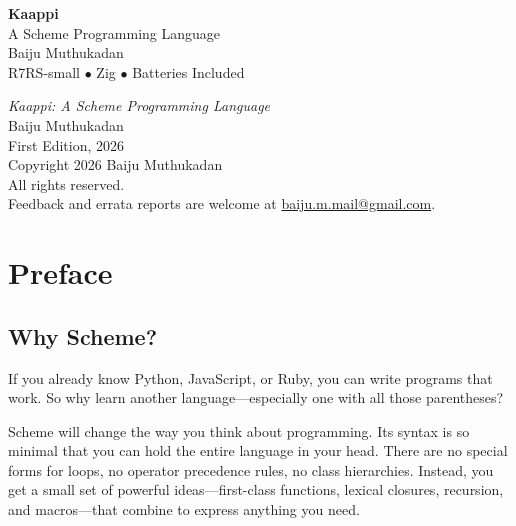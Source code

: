 \documentclass[11pt,twoside,openright]{memoir}
\begin{document}
\frontmatter
\pagestyle{empty}

\thispagestyle{empty}
\begin{center}
    \vspace*{3cm}
    {\fontsize{32}{38}\selectfont\sffamily\bfseries\color{darkbrown}
     Kaappi}\\[1cm]
    {\Large\sffamily A Scheme Programming Language}\\[3cm]
    {\large\sffamily Baiju Muthukadan}\\[1cm]
    \vfill
    {\normalsize\sffamily R7RS-small $\bullet$ Zig $\bullet$ Batteries Included}\\[1.5cm]
\end{center}
\newpage

\thispagestyle{empty}
\vspace*{\fill}
\begin{center}
    \textit{Kaappi: A Scheme Programming Language}\\[1em]
    Baiju Muthukadan\\[2em]
    First Edition, 2026\\[2em]
    Copyright \textcopyright{} 2026 Baiju Muthukadan\\
    All rights reserved.\\[2em]
    \vspace{2em}
    Feedback and errata reports are welcome at \href{mailto:baiju.m.mail@gmail.com}{baiju.m.mail@gmail.com}.
\end{center}
\vspace*{\fill}
\cleardoublepage

\pagestyle{plain}
\tableofcontents*
\cleardoublepage

\chapter{Preface}

\section*{Why Scheme?}

If you already know Python, JavaScript, or Ruby, you can write programs that work. So why learn another language---especially one with all those parentheses?

Scheme will change the way you think about programming. Its syntax is so minimal that you can hold the entire language in your head. There are no special forms for loops, no operator precedence rules, no class hierarchies. Instead, you get a small set of powerful ideas---first-class functions, lexical closures, recursion, and macros---that combine to express anything you need.
\end{document}
